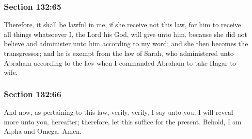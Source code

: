 
	\subsubsection{Section 132:65} %
		\label{DC132-65}

		Therefore, it shall be lawful in me, if she receive not this law, for him to receive all things whatsoever I, the Lord his God, will give unto him, because she did not believe and administer unto him according to my word; and she then becomes the transgressor; and he is exempt from the law of Sarah, who administered unto Abraham according to the law when I commanded Abraham to take Hagar to wife.


	\subsubsection{Section 132:66} %
		\label{DC132-66}

		And now, as pertaining to this law, verily, verily, I say unto you, I will reveal more unto you, hereafter; therefore, let this suffice for the present. Behold, I am Alpha and Omega. Amen.

